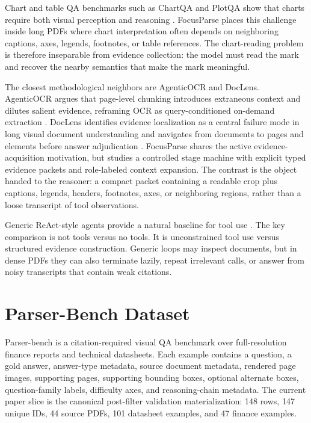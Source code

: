 \documentclass[10pt]{article}
\begin{document}
Chart and table QA benchmarks such as ChartQA and PlotQA show that charts
require both visual perception and reasoning \cite{chartqa2022,plotqa2020}.
FocusParse places this challenge inside long PDFs where chart interpretation
often depends on neighboring captions, axes, legends, footnotes, or table
references. The chart-reading problem is therefore inseparable from evidence
collection: the model must read the mark and recover the nearby semantics that
make the mark meaningful.

The closest methodological neighbors are AgenticOCR and DocLens. AgenticOCR
argues that page-level chunking introduces extraneous context and dilutes
salient evidence, reframing OCR as query-conditioned on-demand extraction
\cite{agenticocr2026}. DocLens identifies evidence localization as a central
failure mode in long visual document understanding and navigates from documents
to pages and elements before answer adjudication \cite{doclens2025}. FocusParse
shares the active evidence-acquisition motivation, but studies a controlled
stage machine with explicit typed evidence packets and role-labeled context
expansion. The contrast is the object handed to the reasoner: a compact packet
containing a readable crop plus captions, legends, headers, footnotes, axes, or
neighboring regions, rather than a loose transcript of tool observations.

Generic ReAct-style agents provide a natural baseline for tool use
\cite{react2023}. The key comparison is not tools versus no tools. It is
unconstrained tool use versus structured evidence construction. Generic loops
may inspect documents, but in dense PDFs they can also terminate lazily, repeat
irrelevant calls, or answer from noisy transcripts that contain weak citations.

\section{Parser-Bench Dataset}

Parser-bench is a citation-required visual QA benchmark over full-resolution
finance reports and technical datasheets. Each example contains a question, a
gold answer, answer-type metadata, source document metadata, rendered page
images, supporting pages, supporting bounding boxes, optional alternate boxes,
question-family labels, difficulty axes, and reasoning-chain metadata. The
current paper slice is the canonical post-filter validation materialization:
148 rows, 147 unique IDs, 44 source PDFs, 101 datasheet examples, and 47
finance examples.
\end{document}
